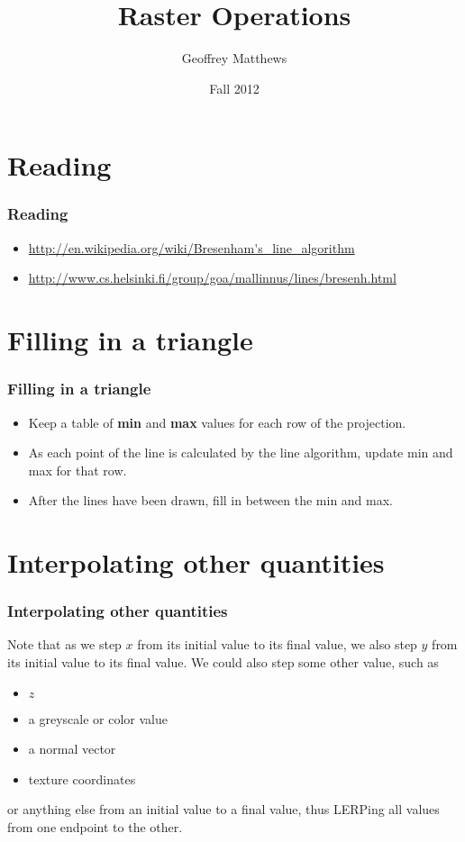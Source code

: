 \documentclass{beamer}
\title
{
Raster Operations
}
\subtitle{} %
\author[Geoffrey Matthews]
{Geoffrey Matthews}
\institute[WWU/CS]
{
  Department of Computer Science\\
  Western Washington University
}
\date{Fall 2012}
\newcommand{\sect}[1]{
\section{#1}
\begin{frame}[fragile]\frametitle{#1}
}
\begin{document}
\begin{frame}
  \titlepage
\end{frame}


\newcommand{\myref}[1]{\small\item\url{#1}}
\newcommand{\myreft}[1]{\footnotesize\item\url{#1}}



\sect{Reading}

\begin{itemize}
\myref{http://en.wikipedia.org/wiki/Bresenham's_line_algorithm}
\myref{http://www.cs.helsinki.fi/group/goa/mallinnus/lines/bresenh.html}
\end{itemize}

\end{frame}

\sect{Filling in a triangle}
\begin{itemize}
\item Keep a table of {\bf min} and {\bf max} values for each row of the 
projection.
\item As each point of the line is calculated by the line algorithm,
update min and max for that row.
\item After the lines have been drawn, fill in between the min and max.
\end{itemize}
\end{frame}

\sect{Interpolating other quantities}

Note that as we step $x$ from its initial value to its final value, we
also step $y$ from its initial value to its final value.  We could
also step some other value, such as
\begin{itemize}
\item  $z$
\item a greyscale or color value
\item a normal vector
\item texture coordinates
\end{itemize}
or anything else from an initial value to a final value, thus
LERPing all values from one endpoint to the other.

\end{frame}
\end{document}
